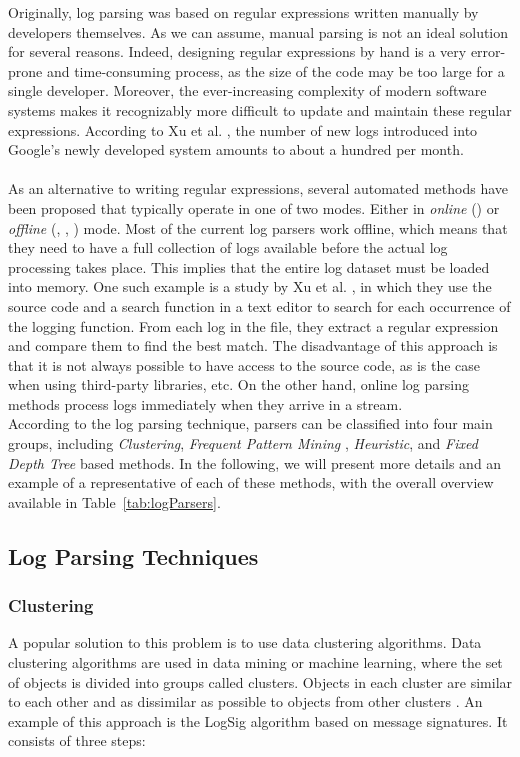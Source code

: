 Originally, log parsing was based on regular expressions written manually by developers themselves. As we can assume, manual parsing is not an ideal solution for several reasons. Indeed, designing regular expressions by hand is a very error-prone and time-consuming process, as the size of the code may be too large for a single developer. Moreover, the ever-increasing complexity of modern software systems makes it recognizably more difficult to update and maintain these regular expressions. According to Xu et al. \cite{xu2009}, the number of new logs introduced into Google's newly developed system amounts to about a hundred per month. \\
\\
As an alternative to writing regular expressions, several automated methods have been proposed that typically operate in one of two modes. Either in \textit{online} (\cite{drain2017}) or \textit{offline} (\cite{vaarandi2003}, \cite{logsig2011}, \cite{Makanju2009ALA}) mode. Most of the current log parsers work offline, which means that they need to have a full collection of logs available before the actual log processing takes place. This implies that the entire log dataset must be loaded into memory. One such example is a study by Xu et al. \cite{xu2008}, in which they use the source code and a search function in a text editor to search for each occurrence of the logging function. From each log in the file, they extract a regular expression and compare them to find the best match. The disadvantage of this approach is that it is not always possible to have access to the source code, as is the case when using third-party libraries, etc. On the other hand, online log parsing methods process logs immediately when they arrive in a stream. \\
According to the log parsing technique, parsers can be classified into four main groups, including \textit{Clustering}, \textit{ Frequent Pattern Mining }, \textit{Heuristic}, and \textit{ Fixed Depth Tree } based methods. In the following, we will present more details and an example of a representative of each of these methods, with the overall overview available in Table~\ref{tab:logParsers}.\\

\subsection{Log Parsing Techniques} \label{log_parsing_techniques}
    
\subsubsection*{Clustering} 
 A popular solution to this problem is to use data clustering algorithms. Data clustering algorithms are used in data mining or machine learning, where the set of objects is divided into groups called clusters. Objects in each cluster are similar to each other and as dissimilar as possible to objects from other clusters \cite{vaarandi2003}. An example of this approach is the LogSig \cite{logsig2011} algorithm based on message signatures. It consists of three steps:

